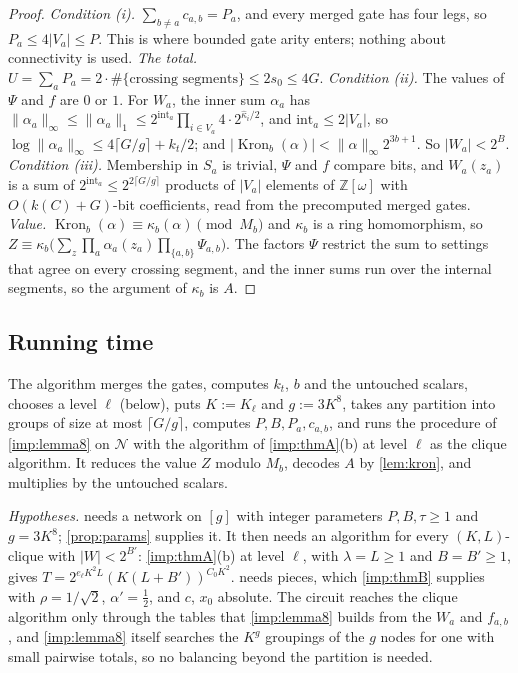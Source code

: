 \documentclass[10pt]{amsart}
\theoremstyle{plain}
\theoremstyle{definition}
\theoremstyle{remark}
\numberwithin{equation}{section}
\newcommand{\Z}{\mathbb{Z}}
\newcommand{\Zw}{\Z[\omega]}
\newcommand{\Kron}{\operatorname{Kron}}
\begin{document}
\begin{proof}
\emph{Condition (i).} $\sum_{b\ne a}c_{a,b}=P_a$, and every merged gate has four legs, so
$P_a\le4|V_a|\le P$. This is where bounded gate arity enters; nothing about connectivity is used.
\emph{The total.} $U=\sum_aP_a=2\cdot\#\{\text{crossing segments}\}\le2s_0\le4G$.
\emph{Condition (ii).} The values of $\Psi$ and $f$ are $0$ or $1$. For $W_a$, the inner sum
$\alpha_a$ has $\|\alpha_a\|_\infty\le\|\alpha_a\|_1\le2^{\mathrm{int}_a}\prod_{i\in V_a}4\cdot2^{\hat\kappa_i/2}$,
and $\mathrm{int}_a\le2|V_a|$, so $\log\|\alpha_a\|_\infty\le4\lceil G/g\rceil+k_t/2$; and
$|\Kron_b(\alpha)|<\|\alpha\|_\infty2^{3b+1}$. So $|W_a|<2^B$.
\emph{Condition (iii).} Membership in $S_a$ is trivial, $\Psi$ and $f$ compare bits, and $W_a(z_a)$
is a sum of $2^{\mathrm{int}_a}\le2^{2\lceil G/g\rceil}$ products of $|V_a|$ elements of $\Zw$ with
$O(k(C)+G)$-bit coefficients, read from the precomputed merged gates.
\emph{Value.} $\Kron_b(\alpha)\equiv\kappa_b(\alpha)\pmod{M_b}$ and $\kappa_b$ is a ring
homomorphism, so
$Z\equiv\kappa_b\bigl(\sum_z\prod_a\alpha_a(z_a)\prod_{\{a,b\}}\Psi_{a,b}\bigr)$. The factors
$\Psi$ restrict the sum to settings that agree on every crossing segment, and the inner sums run
over the internal segments, so the argument of $\kappa_b$ is $A$.
\end{proof}

\subsection{Running time}\label{sec:time}
The algorithm merges the gates, computes $k_t$, $b$ and the untouched scalars, chooses a level
$\ell$ (below), puts $K:=K_\ell$ and $g:=3K^8$, takes any partition into groups of size at most
$\lceil G/g\rceil$, computes $P,B,P_a,c_{a,b}$, and runs the procedure of \cref{imp:lemma8} on
$\mathcal N$ with the algorithm of \cref{imp:thmA}(b) at level $\ell$ as the clique algorithm.
It reduces the value $Z$ modulo $M_b$, decodes $A$ by \cref{lem:kron}, and multiplies by the
untouched scalars.

\emph{Hypotheses.}  needs a network on $[g]$ with integer parameters
$P,B,\tau\ge1$ and $g=3K^8$; \cref{prop:params} supplies it. It then needs an algorithm for every
$(K,L)$-clique with $|W|<2^{B'}$: \cref{imp:thmA}(b) at level $\ell$, with $\lambda=L\ge1$ and
$B=B'\ge1$, gives $T=2^{e_\ell K^2L}(K(L+B'))^{C_0K^2}$.  needs pieces, which
\cref{imp:thmB} supplies with $\rho=1/\sqrt2$, $\alpha'=\frac12$, and $c$, $x_0$ absolute. The
circuit reaches the clique algorithm only through the tables that \cref{imp:lemma8} builds from
the $W_a$ and $f_{a,b}$, and \cref{imp:lemma8} itself searches the $K^g$ groupings of the $g$ nodes
for one with small pairwise totals, so no balancing beyond the partition is needed.
\end{document}
